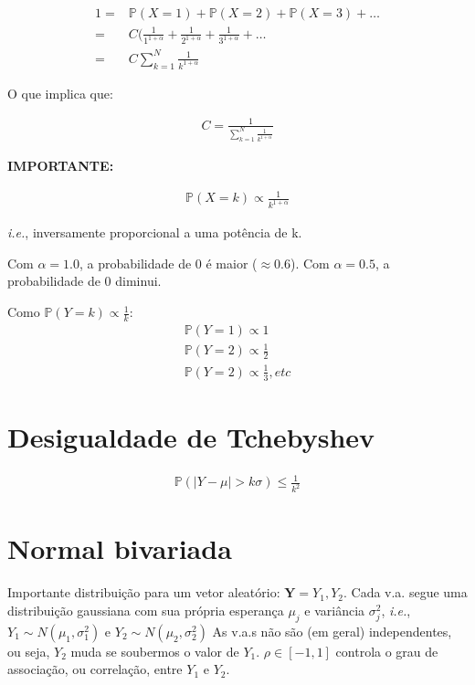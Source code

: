 \documentclass[11pt,a4paper]{article}
\begin{document}
		\begin{eqnarray*}
			1=&\mathbb{P}(X=1)+\mathbb{P}(X=2)+\mathbb{P}(X=3)+\ldots\\
			=&C(\frac{1}{1^{1+\alpha}}+\frac{1}{2^{1+\alpha}}+\frac{1}{3^{1+\alpha}}+\ldots\\
			=&C\sum_{k=1}^N\frac{1}{k^{1+\alpha}}
		\end{eqnarray*}
		
		O que implica que:
		
		\begin{eqnarray*}
			C=\frac{1}{\sum_{k=1}^N\frac{1}{k^{1+\alpha}}}
		\end{eqnarray*}
		
		\textbf{IMPORTANTE:} 
		
		\begin{eqnarray*}
			\mathbb{P}(X=k)\propto\frac{1}{k^{1+\alpha}}
		\end{eqnarray*}
		
		\textit{i.e.}, inversamente proporcional a uma potência de k.
		
		Com $\alpha=1.0$, a probabilidade de 0 é maior ($\approx 0.6$).
		Com $\alpha=0.5$, a probabilidade de 0 diminui.
		
		Como $\mathbb{P}(Y=k)\propto\frac{1}{k}$:
		\begin{eqnarray*}
			\mathbb{P}(Y=1)\propto 1\\
			\mathbb{P}(Y=2)\propto\frac{1}{2}\\
			\mathbb{P}(Y=2)\propto\frac{1}{3}, etc
		\end{eqnarray*}
		
		\section{Desigualdade de Tchebyshev}
		
		\begin{eqnarray*}
			\mathbb{P}(|Y-\mu|>k\sigma)\leq \frac{1}{k^2}
		\end{eqnarray*}
		
		\section{Normal bivariada}
		
		Importante distribuição para um vetor aleatório: $\textbf{Y}=Y_1,Y_2$.
		Cada v.a. segue uma distribuição gaussiana com sua própria esperança $\mu_j$ e variância $\sigma_{j}^{2}$, \textit{i.e.}, $Y_1\sim N(\mu_1,\sigma_1^2)$ e $Y_2\sim N(\mu_2,\sigma_2^2)$
		As v.a.s não são (em geral) independentes, ou seja, $Y_2$ muda se soubermos o valor de $Y_1$.
		$\rho\in [-1,1]$ controla o grau de associação, ou correlação, entre $Y_1$ e $Y_2$.
		
\end{document}
